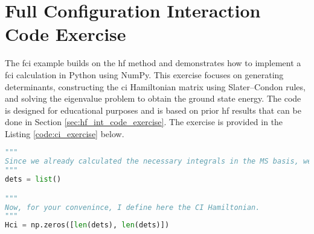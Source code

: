 \section{Full Configuration Interaction Code Exercise}

The \acrshort{fci} example builds on the \acrshort{hf} method and demonstrates how to implement a \acrshort{fci} calculation in Python using NumPy. This exercise focuses on generating determinants, constructing the \acrshort{ci} Hamiltonian matrix using Slater--Condon rules, and solving the eigenvalue problem to obtain the ground state energy. The code is designed for educational purposes and is based on prior \acrshort{hf} results that can be done in Section \ref{sec:hf_int_code_exercise}. The exercise is provided in the Listing \ref{code:ci_exercise} below.

\raggedbottom\begin{lstlisting}[language=Python, caption={\acrshort{ci} exercise code. Here, student is expected to calculate the \acrshort{ci} ground state energy. The task here is to fill the  \acrshort{ci} Hamiltonian using the Slater--Condon rules and diagonalize it.}, label=code:ci_exercise]
"""
Since we already calculated the necessary integrals in the MS basis, we can proceed. The next step involves generating determinants. We will store these in a simple list, with each determinant represented by an array of numbers, where each number corresponds to an occupied spinorbital. Since we are programming for Full Configuration Interaction (FCI), we aim to generate all possible determinants. However, should we decide to implement methods like CIS, CID, or CISD, we could easily limit the number of excitations. It is important to remember that for all CI methods, the rest of the code remains unchanged. The only difference lies in the determinants used. Don't overcomplicate this. Generating all possible determinants can be efficiently achieved using a simple list comprehension. I recommend employing the combinations function from the itertools package to facilitate this task.
"""
dets = list()

"""
Now, for your convenince, I define here the CI Hamiltonian.
"""
Hci = np.zeros([len(dets), len(dets)])


\end{lstlisting}
